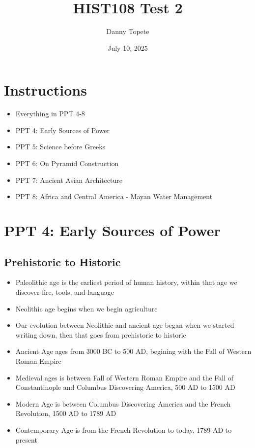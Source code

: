\documentclass{article}
\title{HIST108 Test 2}
\date{July 10, 2025}
\author{Danny Topete}
\begin{document}
\maketitle
\section*{Instructions}
\begin{itemize}
  \item Everything in PPT 4-8
  \item PPT 4: Early Sources of Power
  \item PPT 5: Science before Greeks
  \item PPT 6: On Pyramid Construction
  \item PPT 7: Ancient Asian Architecture
  \item PPT 8: Africa and Central America - Mayan Water Management
\end{itemize}

\section{PPT 4: Early Sources of Power}
\subsection{Prehistoric to Historic}
\begin{itemize}
  \item Paleolithic age is the earliest period of human history,
    within that age we discover fire, tools, and language
  \item Neolithic age begins when we begin agriculture
  \item Our evolution between Neolithic and ancient age began when we
    started writing down, then that goes from
    prehistoric to historic
  \item Ancient Age ages from 3000 BC to 500 AD, begining
    with the Fall of Western Roman Empire
  \item Medieval ages is between Fall of Western Roman Empire
    and the Fall of Constantinople and Columbus Discovering America, 500 AD to 1500 AD
  \item Modern Age is between Columbus Discovering America and the
    French Revolution, 1500 AD to 1789 AD
  \item Contemporary Age is from the French Revolution to today, 1789 AD to present
\end{itemize}
\end{document}
